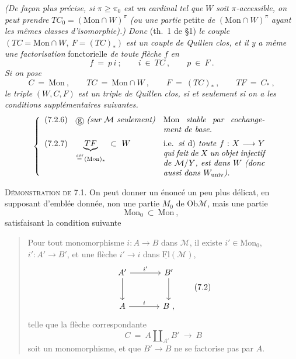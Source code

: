 \documentclass[11pt]{article}
\newcommand{\msp}[1]{\marginpar{\footnotesize [#1]}}
\newcommand{\Ob}{\mathrm{Ob}}
\newcommand{\Fl}{\mathrm{Fl}}
\newcommand{\cercle}[1]{\tikz[baseline=(X.base)]\node[draw,circle,inner sep=0.6pt](X){#1};}
\newcommand{\Mon}{\mathrm{Mon}}
\begin{document}
\textit{(De façon plus précise, si} $\pi \geq \pi_0$ \textit{est un cardinal tel que} $W$ \textit{soit} $\pi$\textit{-accessible, on peut prendre} $TC_0 = (\Mon \cap W)^{\pi}$ \textit{(ou une partie} petite \textit{de} $(\Mon \cap W)^{\pi}$ \textit{ayant les mêmes classes d'isomorphie).) Donc} (th.~1 de §1) \textit{le couple} $(TC = \Mon \cap W,\ F = (TC)_*)$ \textit{est un couple de Quillen clos, et il y a même une factorisation} fonctorielle \textit{de toute flèche} $f$ \textit{en}
\[
f \ = \ p\, i \ ; \qquad i \ \in \ TC \ , \qquad p \ \in \ F \ . \tag*{(7.2.4)}
\]
\textit{Si on pose}
\[
C \ = \ \Mon \ , \qquad TC \ = \ \Mon \cap W \ , \qquad F \ = \ (TC)_* \ , \qquad TF \ = \ C_* \ , \tag*{(7.2.5)}
\]
\textit{le triple} $(W, C, F)$ \textit{est un triple de Quillen clos, si et seulement si on a les conditions supplémentaires suivantes.}
\[
\left\{
\begin{array}{lll}
\text{(7.2.6)} & \cercle{g}\ \text{\textit{(sur $\mathcal{M}$ seulement)}} & \parbox[t]{0.36\textwidth}{Mon \textit{stable par cochangement de base.}} \\[4ex]
\text{(7.2.7)} & \underbrace{TF}_{\overset{\text{déf}}{=}\,(\Mon)_*} \ \subset \ W & \parbox[t]{0.36\textwidth}{i.e. \textit{si} d) \textit{toute} $f : X \longrightarrow Y$ \textit{qui fait de} $X$ \textit{un objet injectif de} $\mathcal{M}/Y$\textit{, est dans} $W$ \textit{(donc aussi dans} $W_{\mathrm{univ}}$\textit{).}}
\end{array}
\right.
\]

\msp{page 90}

\textsc{Démonstration de} 7.1. On peut donner un énoncé un peu plus délicat, en supposant d'emblée donnée, non une partie $M_0$ de $\Ob \mathcal{M}$, mais une partie
\[
\Mon_0 \ \subset \ \Mon \ , \tag*{(7.1)}
\]
satisfaisant la condition suivante

\begin{quote}
Pour tout monomorphisme $i : A \longrightarrow B$ dans $\mathcal{M}$, il existe $i' \in \Mon_0$, $i' : A' \longrightarrow B'$, et une flèche $i' \longrightarrow i$ dans $\underline{\Fl}(\mathcal{M})$,
\[
\begin{tikzcd}[row sep=large, column sep=large]
A' \arrow[r, "{i'}"] \arrow[d] & B' \arrow[d] \\
A \arrow[r, "i"] & B \ ,
\end{tikzcd}
\tag*{(7.2)}
\]
telle que la flèche correspondante
\[
C \ = \ A \amalg_{A'} B' \ \longrightarrow \ B
\]
soit un monomorphisme, et que $B' \longrightarrow B$ ne se factorise pas par $A$.
\end{quote}
\end{document}
